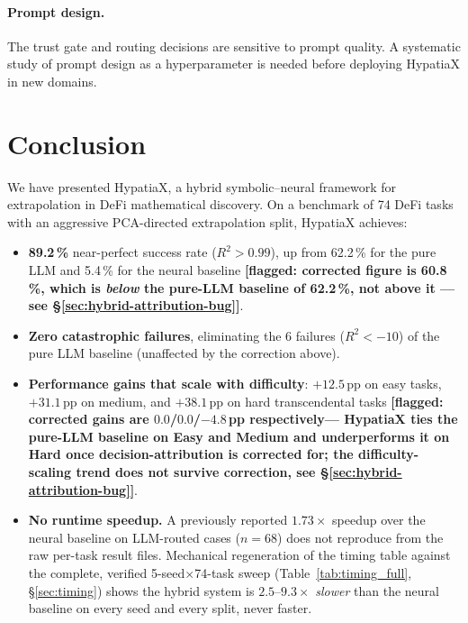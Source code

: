 \documentclass[twoside,11pt]{article}
\newcommand{\Rsq}{R^{2}}
\begin{document}
\paragraph{Prompt design.}
The trust gate and routing decisions are sensitive to prompt quality.  A systematic
study of prompt design as a hyperparameter is needed before deploying HypatiaX
in new domains.

\section{Conclusion}
\label{sec:conclusion}

We have presented HypatiaX, a hybrid symbolic--neural framework for extrapolation
in DeFi mathematical discovery.  On a benchmark of 74 DeFi tasks with an aggressive
PCA-directed extrapolation split, HypatiaX achieves:

\begin{itemize}
  \item \textbf{89.2\,\%} near-perfect success rate ($\Rsq > 0.99$), up from
    62.2\,\% for the pure LLM and 5.4\,\% for the neural baseline
    \textbf{[flagged: corrected figure is 60.8\,\%, which is \emph{below}
    the pure-LLM baseline of 62.2\,\%, not above it --- see
    \S\ref{sec:hybrid-attribution-bug}]}.
  \item \textbf{Zero catastrophic failures}, eliminating the 6 failures ($\Rsq < -10$)
    of the pure LLM baseline (unaffected by the correction above).
  \item \textbf{Performance gains that scale with difficulty}: $+12.5$\,pp on easy tasks,
    $+31.1$\,pp on medium, and $+38.1$\,pp on hard transcendental tasks
    \textbf{[flagged: corrected gains are $0.0$/$0.0$/$-4.8$\,pp respectively---
    HypatiaX ties the pure-LLM baseline on Easy and Medium and underperforms it
    on Hard once decision-attribution is corrected for; the difficulty-scaling
    trend does not survive correction, see \S\ref{sec:hybrid-attribution-bug}]}.
  \item \textbf{No runtime speedup.} A previously reported $1.73\times$ speedup
    over the neural baseline on LLM-routed cases ($n=68$) does not reproduce
    from the raw per-task result files. Mechanical regeneration of the timing
    table against the complete, verified 5-seed$\times$74-task sweep
    (Table~\ref{tab:timing_full}, \S\ref{sec:timing}) shows the hybrid
    system is $2.5$--$9.3\times$ \emph{slower} than the neural baseline on
    every seed and every split, never faster.
\end{itemize}
\end{document}
